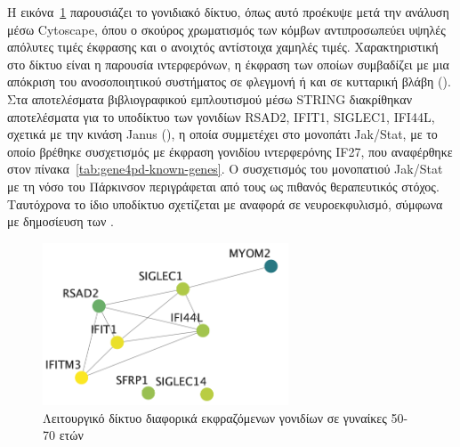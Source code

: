 \documentclass[12pt]{report}
\begin{document}
            Η εικόνα~\ref{fig:cyto_females_50_70} παρουσιάζει το γονιδιακό δίκτυο, όπως αυτό προέκυψε μετά την ανάλυση μέσω Cytoscape, όπου ο σκούρος χρωματισμός των κόμβων αντιπροσωπεύει υψηλές απόλυτες τιμές έκφρασης και ο ανοιχτός αντίστοιχα χαμηλές τιμές. Χαρακτηριστική στο δίκτυο είναι η παρουσία ιντερφερόνων, η έκφραση των οποίων συμβαδίζει με μια απόκριση του ανοσοποιητικού συστήματος σε φλεγμονή ή και σε κυτταρική βλάβη (\emph{\cite{Kopitar-Jerala2017TheActivation}}). Στα αποτελέσματα βιβλιογραφικού εμπλουτισμού μέσω STRING διακρίθηκαν αποτελέσματα για το υποδίκτυο των γονιδίων RSAD2, IFIT1, SIGLEC1, IFI44L, σχετικά με την κινάση Janus (\emph{\cite{Yamaoka2004TheJaks}}), η οποία συμμετέχει στο μονοπάτι Jak/Stat, με το οποίο βρέθηκε συσχετισμός με έκφραση γονιδίου ιντερφερόνης IF27, που αναφέρθηκε στον πίνακα~\ref{tab:gene4pd-known-genes}. Ο συσχετισμός του μονοπατιού Jak/Stat με τη νόσο του Πάρκινσον περιγράφεται από τους \cite{Lashgari2021TheDisease} ως πιθανός θεραπευτικός στόχος. Ταυτόχρονα το ίδιο υποδίκτυο σχετίζεται με αναφορά σε νευροεκφυλισμό, σύμφωνα με δημοσίευση των \cite{Cooray2023NeuroinflammationIRAK4}.
            \begin{figure}[h]
                \centering
                \includegraphics[width=0.65\textwidth]{Cytoscape/cyto_females_50_70.png}
                \caption{Λειτουργικό δίκτυο διαφορικά εκφραζόμενων γονιδίων σε γυναίκες 50-70 ετών}
                \label{fig:cyto_females_50_70}
            \end{figure}
\end{document}
